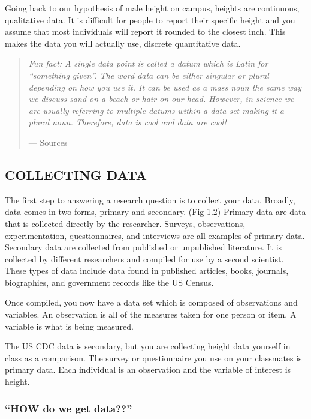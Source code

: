 \documentclass[
]{book}
\begin{document}
Going back to our hypothesis of male height on campus, heights are continuous, qualitative data.
It is difficult for people to report their specific height and you assume that most individuals will report it rounded to the closest inch.
This makes the data you will actually use, discrete quantitative data.

\begin{quote}
\emph{Fun fact: A single data point is called a datum which is Latin for ``something given''. The word data can be either singular or plural depending on how you use it. It can be used as a mass noun the same way we discuss sand on a beach or hair on our head. However, in science we are usually referring to multiple datums within a data set making it a plural noun. Therefore, data is cool and data are cool!}

--- Sources
\end{quote}

\hypertarget{collecting-data}{%
\subsection{COLLECTING DATA}\label{collecting-data}}

The first step to answering a research question is to collect your data. Broadly, data comes in two forms, primary and secondary. (Fig 1.2) Primary data are data that is collected directly by the researcher. Surveys, observations, experimentation, questionnaires, and interviews are all examples of primary data. Secondary data are collected from published or unpublished literature. It is collected by different researchers and compiled for use by a second scientist. These types of data include data found in published articles, books, journals, biographies, and government records like the US Census.

Once compiled, you now have a data set which is composed of observations and variables. An observation is all of the measures taken for one person or item. A variable is what is being measured.

The US CDC data is secondary, but you are collecting height data yourself in class as a comparison. The survey or questionnaire you use on your classmates is primary data. Each individual is an observation and the variable of interest is height.

\hypertarget{how-do-we-get-data}{%
\subsubsection{``HOW do we get data??''}\label{how-do-we-get-data}}
\end{document}
